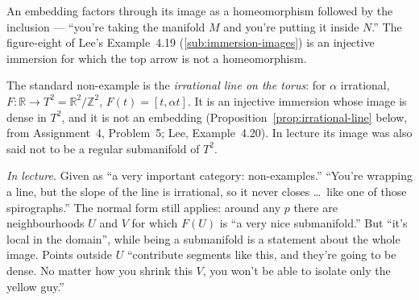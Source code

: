 \documentclass[11pt]{report}
\begin{document}
\begin{center}
\end{center}

An embedding factors through its image as a homeomorphism followed by the inclusion --- ``you're taking the manifold $M$ and you're putting it inside $N$.'' The figure-eight of Lee's Example~4.19 (\ref{sub:immersion-images}) is an injective immersion for which the top arrow is not a homeomorphism.

The standard non-example is the \emph{irrational line on the torus}: for $\alpha$ irrational, $F : \mathbb{R} \to T^2 = \mathbb{R}^2/\mathbb{Z}^2$, $F(t) = [t, \alpha t]$. It is an injective immersion whose image is dense in $T^2$, and it is not an embedding (Proposition~\ref{prop:irrational-line} below, from Assignment~4, Problem~5; Lee, Example~4.20). In lecture its image was also said not to be a regular submanifold of $T^2$.

\textit{In lecture.} Given as ``a very important category: non-examples.'' ``You're wrapping a line, but the slope of the line is irrational, so it never closes \ldots\ like one of those spirographs.'' The normal form still applies: around any $p$ there are neighbourhoods $U$ and $V$ for which $F(U)$ is ``a very nice submanifold.'' But ``it's local in the domain'', while being a submanifold is a statement about the whole image. Points outside $U$ ``contribute segments like this, and they're going to be dense. No matter how you shrink this $V$, you won't be able to isolate only the yellow guy.''
\end{document}
